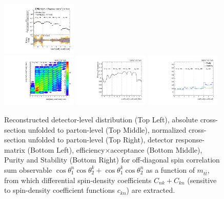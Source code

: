 \begin{refsection}
\begin{figure}[htb]
\begin{center}
 \includegraphics[width=0.32\textwidth]{fig_fullRun2UL/unfolding/combined/UnfoldedResultsNorm_c_Pnk_mttbar.pdf} \\
 \includegraphics[width=0.32\textwidth]{fig_fullRun2UL/unfolding/combined/ResponseMatrix_c_Pnk_mttbar.pdf}
 \includegraphics[width=0.32\textwidth]{fig_fullRun2UL/unfolding/combined/TotEff_c_Pnk_mttbar.pdf}
 \includegraphics[width=0.32\textwidth]{fig_fullRun2UL/unfolding/combined/PurStab_c_Pnk_mttbar.pdf} \\
\caption{Reconstructed detector-level distribution (Top Left), absolute cross-section unfolded to parton-level (Top Middle), normalized cross-section unfolded to parton-level (Top Right), detector response-matrix (Bottom Left), efficiency$\times$acceptance (Bottom Middle), Purity and Stability (Bottom Right) for off-diagonal spin correlation sum observable $\cos\theta_{1}^{n}\cos\theta_{2}^{k}+\cos\theta_{1}^{k}\cos\theta_{2}^{n}$ as a function of $m_{t\bar{t}}$, from which differential spin-density coefficients $C_{nk}+C_{kn}$ (sensitive to spin-density coefficient functions $c_{k n}$) are extracted.}
\label{fig:c_Pnk_mttbar}
\end{center}
\end{figure}
\clearpage

\end{refsection}
